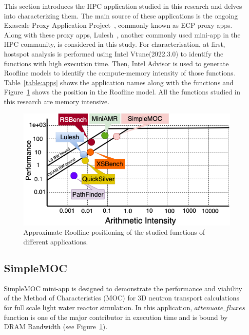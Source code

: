
This section introduces the HPC application studied in this research and delves into characterizing them. The main source of these applications is the ongoing Exascale Proxy Application Project~\cite{ecpapp}, commonly known as ECP proxy apps. Along with these proxy apps, Lulesh~\cite{karlin2012lulesh}, another commonly used mini-app in the HPC community, is considered in this study. For characterisation, at first, hostspot analysis is performed using Intel Vtune(2022.3.0) to identify the functions with high execution time. Then, Intel Advisor is used to generate Roofline models to identify the compute-memory intensity of those functions. Table~\ref{table:apps} shows the application names along with the functions and Figure~\ref{fig:roofline} shows the position in the Roofline model. All the functions studied in this research are memory intensive.

\begin{figure}[t]%
\begin{center}
\includegraphics[width=1\linewidth]{MEMSYS22/figures/roofline/roofline_pim.png}
\end{center}
  \vspace{-0.1in}
\caption{Approximate Roofline positioning of the studied functions of different applications.}
\label{fig:roofline}
\vspace{-0.2in}
\end{figure}



\subsection{SimpleMOC}
SimpleMOC mini-app is designed to demonstrate the performance and viability of the Method of Characteristics (MOC) for 3D neutron transport calculations for full scale
light water reactor simulation. In this application, $attenuate\_fluxes$ function is one of the major contributor in execution time and is bound by DRAM Bandwidth (see Figure~\ref{fig:roofline}). 


